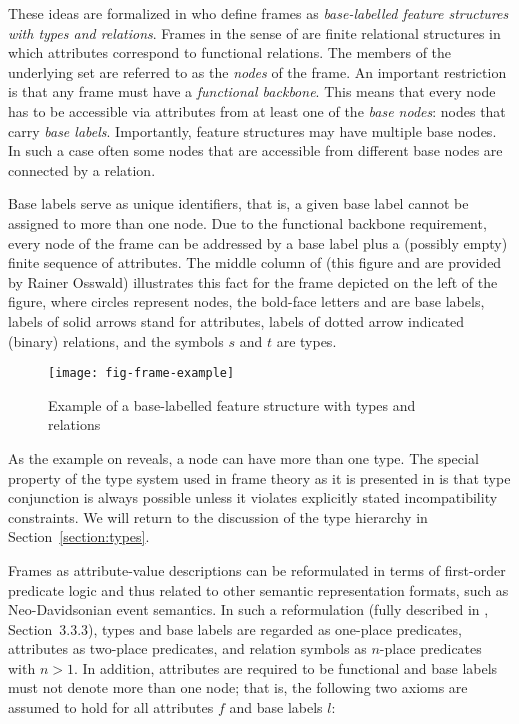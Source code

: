 These ideas are formalized in \citet{KallmeyerOsswald:13} who define frames
as \emph{base-labelled feature structures with types and relations}.
Frames in the sense of \citet{KallmeyerOsswald:13} are finite relational structures in which attributes correspond to functional relations. The members of the underlying set are referred to as the \emph{nodes} of the frame. An important restriction is that any frame must have a \emph{functional
backbone}. This means that every node has to be accessible via attributes
from at least one of the \emph{base nodes}: nodes that carry \emph{base labels}. Importantly, feature structures may have multiple base nodes. In such a case often some nodes that are accessible from different base nodes are connected by a relation.

Base labels serve as unique identifiers, that is, a given base label cannot be assigned to more than one node. Due to the functional backbone requirement, every node of the frame can be addressed by a base label
plus a (possibly empty) finite sequence of attributes.
The middle column of  (this figure and  are provided by Rainer Osswald) illustrates this fact
for the frame depicted on the left of the figure, where circles
represent nodes, the bold-face letters  and  are base
labels, labels of solid arrows stand for attributes, labels of dotted arrow
indicated (binary) relations, and the symbols $s$ and $t$ are types.
%
\begin{figure}
\hfill
\texttt{[image: fig-frame-example]}
\hfill
\caption{Example of a base-labelled feature structure with types and relations}
\label{fig-frame-example}
\end{figure}%
%

As the example on  reveals, a node can have more than one type. The special property of the type system used in frame theory as it is presented in \citealt{KallmeyerOsswald:13} is that type conjunction is always possible unless it violates explicitly stated incompatibility constraints. We will return to the discussion of the type hierarchy in Section~\ref{section:types}.

Frames as attribute-value descriptions can be reformulated in terms of first-order predicate logic and thus related to other semantic representation formats, such as Neo-Davidsonian event semantics. In such a reformulation (fully described in \citealt{KallmeyerOsswald:13}, Section~3.3.3), types and base
labels are regarded as one-place predicates, attributes as two-place predicates, and relation symbols as $n$-place predicates with $n>1$.
In addition, attributes are required to be functional and base labels must
not denote more than one node;
that is, the following two axioms are assumed to hold for all
attributes $f$ and base labels $l$:

